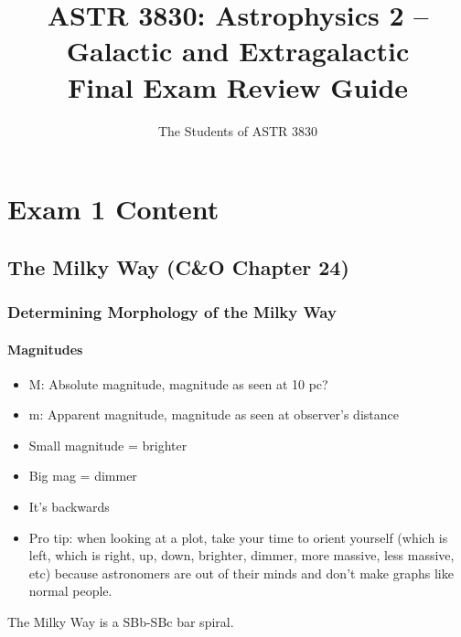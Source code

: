 \documentclass{book}
\title{ASTR 3830: Astrophysics 2 – Galactic and Extragalactic \\
Final Exam Review Guide}
\author{The Students of ASTR 3830}
\begin{document}
\maketitle
\tableofcontents
\chapter{Exam 1 Content}
\section{The Milky Way (C\&O Chapter 24)}
\subsection{Determining Morphology of the Milky Way}
\subsubsection{Magnitudes}
\begin{itemize}
    \item M: Absolute magnitude, magnitude as seen at 10 pc?
    \item m: Apparent magnitude, magnitude as seen at observer’s distance
    \item Small magnitude = brighter
    \item Big mag = dimmer
    \item It’s backwards
    \item Pro tip: when looking at a plot, take your time to orient yourself (which is left, which is right, up, down, brighter, dimmer, more massive, less massive, etc) because astronomers are out of their minds and don’t make graphs like normal people.
\end{itemize}
The Milky Way is a SBb-SBc bar spiral.
\end{document}

